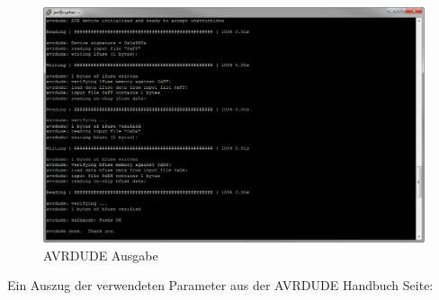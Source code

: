 \begin{figure}[h]
\centering
\includegraphics[width=13cm]{content/pictures/Anleitung/neuerProzessor/avrOutput.png}
\caption{AVRDUDE Ausgabe}
\end{figure}

Ein Auszug der verwendeten Parameter aus der AVRDUDE Handbuch Seite:

